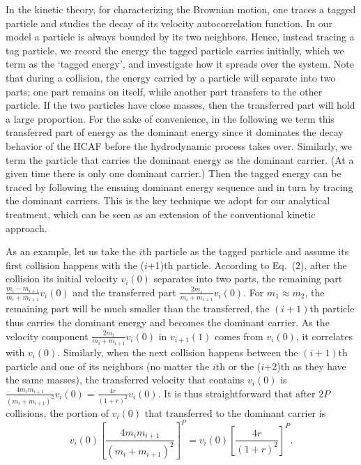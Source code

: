\documentclass[twocolumn,secnumarabic,amssymb, nobibnotes, aps, pre,superscriptaddress]{revtex4}
\begin{document}
In the kinetic theory, for characterizing the Brownian motion, one traces a tagged particle and studies the decay of its velocity autocorrelation function. In our  model a particle is always bounded by its two neighbors. Hence, instead tracing a tag particle, we record the energy the tagged particle carries initially, which we term as the `tagged energy', and investigate how it spreads over the system. Note that during a collision, the energy carried by a particle will separate into two parts; one part remains on itself, while another part transfers to the other particle. If the two particles have close masses, then the transferred part will hold a large proportion. For the sake of convenience, in the following we term this transferred part of energy as the dominant energy since it dominates the decay behavior of the HCAF before the hydrodynamic process takes over. Similarly, we term the particle that carries the dominant energy as the dominant carrier. (At a given time there is only one dominant carrier.) Then the tagged energy can be traced by following the ensuing dominant energy sequence and  in turn by tracing the dominant carriers. This is the key technique we adopt for our analytical treatment, which can be seen as an extension of the conventional kinetic approach.

As an example, let us take the $i$th particle as the tagged particle and assume its first collision happens with the ($i$+1)th particle. According to Eq.~(2), after the collision its initial velocity $v_i(0)$ separates into two parts, the remaining part $\frac{m_i-m_{i+1}}{m_i+m_{i+1}}v_i(0)$ and the transferred part $\frac{2m_i}{m_i+m_{i+1}}v_i(0)$. For $m_1\approx m_2$, the remaining part will be much smaller than the transferred, the $(i+1)$th particle thus carries the dominant energy and becomes the dominant carrier. As the velocity component $\frac{2m_i}{m_i+m_{i+1}}v_i(0)$ in $v_{i+1}(1)$ comes from $v_i(0)$, it correlates with $v_i(0)$. Similarly, when the next collision happens between the $(i+1)$th particle and one of its neighbors (no matter the $i$th or the ($i$+2)th as they have the same masses), the transferred  velocity that contains $v_i(0)$ is $\frac{4m_{i} m_{i+1}}{(m_i+m_{i+1})^2}v_i(0)=\frac{4r}{(1+r)^2}v_i(0)$. It is thus straightforward that after $2P$ collisions, the portion of $v_i(0)$ that transferred to the dominant carrier is
\begin{equation}
v_i(0)[\frac{4m_{i} m_{i+1}}{(m_i+m_{i+1})^2}]^P=v_i(0)[\frac{4r}{(1+r)^2}]^P.
\end{equation}
\end{document}
